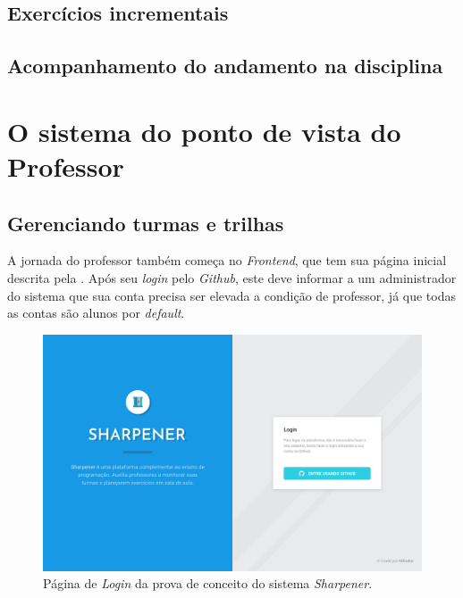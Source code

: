 
\subsection{Exercícios incrementais}

\subsection{Acompanhamento do andamento na disciplina}

\section{O sistema do ponto de vista do Professor} 
\subsection{Gerenciando turmas e trilhas}
A jornada do professor também começa no \emph{Frontend}, que tem sua página inicial descrita pela .
Após seu \emph{login} pelo \emph{Github}, este deve informar a um administrador 
do sistema que sua conta precisa ser elevada a condição de professor, já que todas as contas são alunos por \emph{default}.

  \begin{figure}[htpb]
    \centering
    \includegraphics[width=\linewidth]{images/mocks/login.png}
    \caption{Página de \emph{Login} da prova de conceito do sistema \emph{Sharpener}.}%
    \label{fig:login}
  \end{figure}

